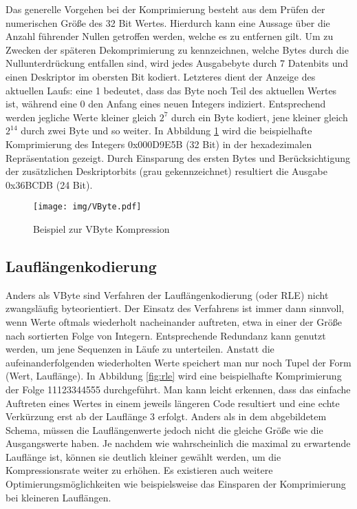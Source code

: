 Das generelle Vorgehen bei der Komprimierung besteht aus dem Prüfen der numerischen Größe des 32 Bit Wertes. Hierdurch kann eine Aussage über die Anzahl führender Nullen getroffen werden, welche es zu entfernen gilt. Um zu Zwecken der späteren Dekomprimierung zu kennzeichnen, welche Bytes durch die Nullunterdrückung entfallen sind, wird jedes Ausgabebyte durch 7 Datenbits und einen Deskriptor im obersten Bit kodiert. Letzteres dient der Anzeige des aktuellen Laufs: eine 1 bedeutet, dass das Byte noch Teil des aktuellen Wertes ist, während eine 0 den Anfang eines neuen Integers indiziert. Entsprechend werden jegliche Werte kleiner gleich $2^7$ durch ein Byte kodiert, jene kleiner gleich $2^{14}$ durch zwei Byte und so weiter. In Abbildung \ref{fig:vbyte} wird die beispielhafte Komprimierung des Integers 0x000D9E5B (32 Bit) in der hexadezimalen Repräsentation gezeigt. Durch Einsparung des ersten Bytes und Berücksichtigung der zusätzlichen Deskriptorbits (grau gekennzeichnet) resultiert die Ausgabe 0x36BCDB (24 Bit).

\begin{figure}
	\texttt{[image: img/VByte.pdf]}
	\centering
	\caption{Beispiel zur VByte Kompression}
	\label{fig:vbyte}
\end{figure}

\subsection{Lauflängenkodierung}

Anders als VByte sind Verfahren der Lauflängenkodierung \cite{Reghbati1981} (oder \ac{RLE}) nicht zwangsläufig byteorientiert. Der Einsatz des Verfahrens ist immer dann sinnvoll, wenn Werte oftmals wiederholt nacheinander auftreten, etwa in einer der Größe nach sortierten Folge von Integern. Entsprechende Redundanz kann genutzt werden, um jene Sequenzen in Läufe zu unterteilen. Anstatt die aufeinanderfolgenden wiederholten Werte speichert man nur noch Tupel der Form (Wert, Lauflänge). In Abbildung \ref{fig:rle} wird eine beispielhafte Komprimierung der Folge 11123344555 durchgeführt. Man kann leicht erkennen, dass das einfache Auftreten eines Wertes in einem jeweils längeren Code resultiert und eine echte Verkürzung erst ab der Lauflänge 3 erfolgt. Anders als in dem abgebildetem Schema, müssen die Lauflängenwerte jedoch nicht die gleiche Größe wie die Ausgangswerte haben. Je nachdem wie wahrscheinlich die maximal zu erwartende Lauflänge ist, können sie deutlich kleiner gewählt werden, um die Kompressionsrate weiter zu erhöhen. Es existieren auch weitere Optimierungsmöglichkeiten wie beispielsweise das Einsparen der Komprimierung bei kleineren Lauflängen.

